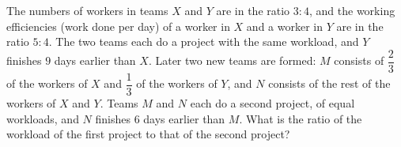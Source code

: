 The numbers of workers in teams $X$ and $Y$ are in the ratio $3:4$, and the working efficiencies (work done per day) of a worker in $X$ and a worker in $Y$ are in the ratio $5:4$. The two teams each do a project with the same workload, and $Y$ finishes $9$ days earlier than $X$. Later two new teams are formed: $M$ consists of $\dfrac{2}{3}$ of the workers of $X$ and $\dfrac{1}{3}$ of the workers of $Y$, and $N$ consists of the rest of the workers of $X$ and $Y$. Teams $M$ and $N$ each do a second project, of equal workloads, and $N$ finishes $6$ days earlier than $M$. What is the ratio of the workload of the first project to that of the second project?
